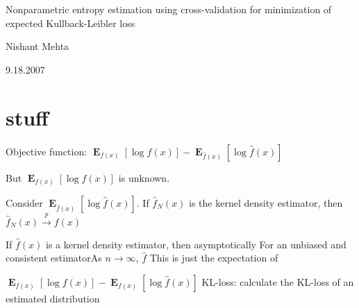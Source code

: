 \documentclass{article}
\DeclareMathOperator*{\E}{\mathbf{E}}
\begin{document}
Nonparametric entropy estimation using cross-validation for minimization of expected Kullback-Leibler loss

Nishant Mehta

9.18.2007

\section{stuff}

Objective function: $\E_{f(x)}[\log f(x)] - \E_{\hat{f}(x)}[\log \hat{f}(x)]$

But $\E_{f(x)}[\log f(x)]$ is unknown.

Consider $\E_{\hat{f}(x)}[\log \hat{f}(x)]$. If $\hat{f}_N(x)$ is the kernel density estimator, then $\hat{f}_N(x) \xrightarrow{p} f(x)$

If $\hat{f}(x)$ is a kernel density estimator, then asymptotically For an unbiased and consistent estimatorAs $n \to \infty$, $\hat{f}$ 
This is just the expectation of 

 $\E_{f(x)}[\log f(x)] - \E_{f(x)}[\log \hat{f}(x)]$
KL-loss: 
calculate the KL-loss of an estimated distribution
\end{document}
